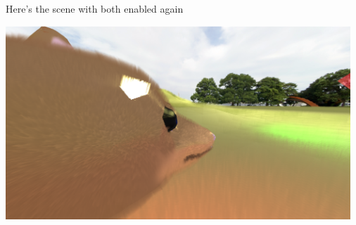 \documentclass[a4paper, 12pt]{article}
\begin{document}
    Here's the scene with both enabled again

    \includegraphics[width=35em]{both}





    
    
\end{document}
